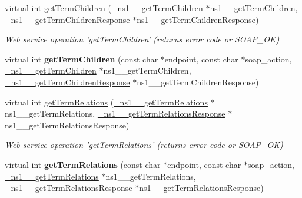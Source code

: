 \begin{DoxyCompactItemize}
\item 
\hypertarget{classOntologyQuerySoapBindingProxy_afd47b72219085c3ef83bd38d80efaef5}{
virtual int \hyperlink{classOntologyQuerySoapBindingProxy_afd47b72219085c3ef83bd38d80efaef5}{getTermChildren} (\hyperlink{class__ns1____getTermChildren}{\_\-ns1\_\-\_\-getTermChildren} $\ast$ns1\_\-\_\-getTermChildren, \hyperlink{class__ns1____getTermChildrenResponse}{\_\-ns1\_\-\_\-getTermChildrenResponse} $\ast$ns1\_\-\_\-getTermChildrenResponse)}
\label{classOntologyQuerySoapBindingProxy_afd47b72219085c3ef83bd38d80efaef5}

\begin{DoxyCompactList}\small\item\em Web service operation 'getTermChildren' (returns error code or SOAP\_\-OK) \end{DoxyCompactList}\item 
\hypertarget{classOntologyQuerySoapBindingProxy_ac823255943fd12fb316094d9a548cf0e}{
virtual int {\bfseries getTermChildren} (const char $\ast$endpoint, const char $\ast$soap\_\-action, \hyperlink{class__ns1____getTermChildren}{\_\-ns1\_\-\_\-getTermChildren} $\ast$ns1\_\-\_\-getTermChildren, \hyperlink{class__ns1____getTermChildrenResponse}{\_\-ns1\_\-\_\-getTermChildrenResponse} $\ast$ns1\_\-\_\-getTermChildrenResponse)}
\label{classOntologyQuerySoapBindingProxy_ac823255943fd12fb316094d9a548cf0e}

\item 
\hypertarget{classOntologyQuerySoapBindingProxy_a3171ee958c0caee6d7a0aa40fc86fa4d}{
virtual int \hyperlink{classOntologyQuerySoapBindingProxy_a3171ee958c0caee6d7a0aa40fc86fa4d}{getTermRelations} (\hyperlink{class__ns1____getTermRelations}{\_\-ns1\_\-\_\-getTermRelations} $\ast$ns1\_\-\_\-getTermRelations, \hyperlink{class__ns1____getTermRelationsResponse}{\_\-ns1\_\-\_\-getTermRelationsResponse} $\ast$ns1\_\-\_\-getTermRelationsResponse)}
\label{classOntologyQuerySoapBindingProxy_a3171ee958c0caee6d7a0aa40fc86fa4d}

\begin{DoxyCompactList}\small\item\em Web service operation 'getTermRelations' (returns error code or SOAP\_\-OK) \end{DoxyCompactList}\item 
\hypertarget{classOntologyQuerySoapBindingProxy_a1690a76a517cd359c56cf37202703e72}{
virtual int {\bfseries getTermRelations} (const char $\ast$endpoint, const char $\ast$soap\_\-action, \hyperlink{class__ns1____getTermRelations}{\_\-ns1\_\-\_\-getTermRelations} $\ast$ns1\_\-\_\-getTermRelations, \hyperlink{class__ns1____getTermRelationsResponse}{\_\-ns1\_\-\_\-getTermRelationsResponse} $\ast$ns1\_\-\_\-getTermRelationsResponse)}
\label{classOntologyQuerySoapBindingProxy_a1690a76a517cd359c56cf37202703e72}


\end{DoxyCompactItemize}
